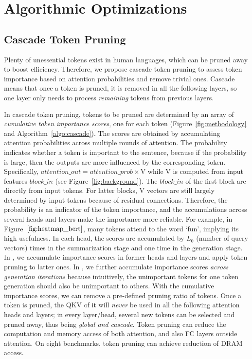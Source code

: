 \section{Algorithmic Optimizations}
\label{sec:method}
\subsection{Cascade Token Pruning}

Plenty of unessential tokens exist in human languages, which can be pruned away to boost efficiency. 
Therefore, we propose cascade token pruning to assess token importance based on attention probabilities and remove trivial ones.
Cascade means that once a token is pruned, it is removed in all the following layers, so one layer only needs to process \emph{remaining} tokens from previous layers.

In cascade token pruning, tokens to be pruned are determined by an array of \emph{cumulative token importance scores}, one for each token (Figure~\ref{fig:methodology} and Algorithm~\ref{algo:cascade}). The scores are obtained by accumulating attention probabilities across multiple rounds of attention. The probability indicates whether a token is important to the sentence, because if the probability is large, then the outputs are more influenced by the corresponding token. Specifically, $attention\_out = attention\_prob \times$V while V is computed from input features $block\_in$ (see Figure~\ref{fig:background}). The $block\_in$ of the first block are directly from input tokens. For latter blocks, V vectors are still largely determined by input tokens because of residual connections. Therefore, the probability is an indicator of the token importance, and the accumulations across several heads and layers make the importance more reliable. For example, in Figure~$\ref{fig:heatmap_bert}$, many tokens attend to the word `fun', implying its high usefulness. In each head, the scores are accumulated by $L_0$ (number of query vectors) times in the summarization stage and one time in the generation stage. In \bert, we accumulate importance scores in former heads and layers and apply token pruning to latter ones. In \gpttwo, we further accumulate importance scores \emph{across generation iterations} because intuitively, the unimportant tokens for one token generation should also be unimportant to others.
With the cumulative importance scores, we can remove a pre-defined pruning ratio of tokens. Once a token is pruned, the QKV of it will \emph{never} be used in all the following attention heads and layers; in every layer/head, several new tokens can be selected and pruned away, thus being \emph{global and cascade}. 
Token pruning can reduce the computation and memory access of both attention, and also FC layers outside attention. On eight \gpttwo benchmarks, token pruning can achieve \prunegpttwodramsaving\x reduction of DRAM access. 



